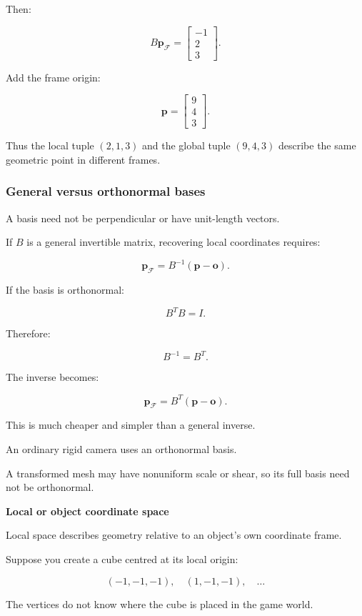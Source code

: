 Then:

\[
 B\mathbf p_{\mathcal F} = \begin{bmatrix}-1\\2\\3\end{bmatrix}.
\]

Add the frame origin:

\[
 \boxed{ \mathbf p= \begin{bmatrix}9\\4\\3\end{bmatrix} }.
\]

Thus the local tuple \((2,1,3)\) and the global tuple \((9,4,3)\) describe the same geometric point in different frames.

\subsubsection{General versus orthonormal bases}\label{general-versus-orthonormal-bases}

A basis need not be perpendicular or have unit-length vectors.

If \(B\) is a general invertible matrix, recovering local coordinates requires:

\[
 \boxed{ \mathbf p_{\mathcal F} = B^{-1}(\mathbf p-\mathbf o) }.
\]

If the basis is orthonormal:

\[
 B^TB=I.
\]

Therefore:

\[
 B^{-1}=B^T.
\]

The inverse becomes:

\[
 \boxed{ \mathbf p_{\mathcal F} = B^T(\mathbf p-\mathbf o) }.
\]

This is much cheaper and simpler than a general inverse.

An ordinary rigid camera uses an orthonormal basis.

A transformed mesh may have nonuniform scale or shear, so its full basis need not be orthonormal.

\textbf{Local or object coordinate space}

Local space describes geometry relative to an object's own coordinate frame.

Suppose you create a cube centred at its local origin:

\[
 (-1,-1,-1),\quad (1,-1,-1),\quad\ldots
\]

The vertices do not know where the cube is placed in the game world.

